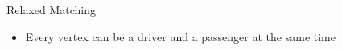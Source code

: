 \begin{frame}{Relaxed Matching}
\begin{itemize}
  \item Every vertex can be a driver and a passenger at the same time
\end{itemize}
\centering
\scalebox{.90}{

}
\end{frame}